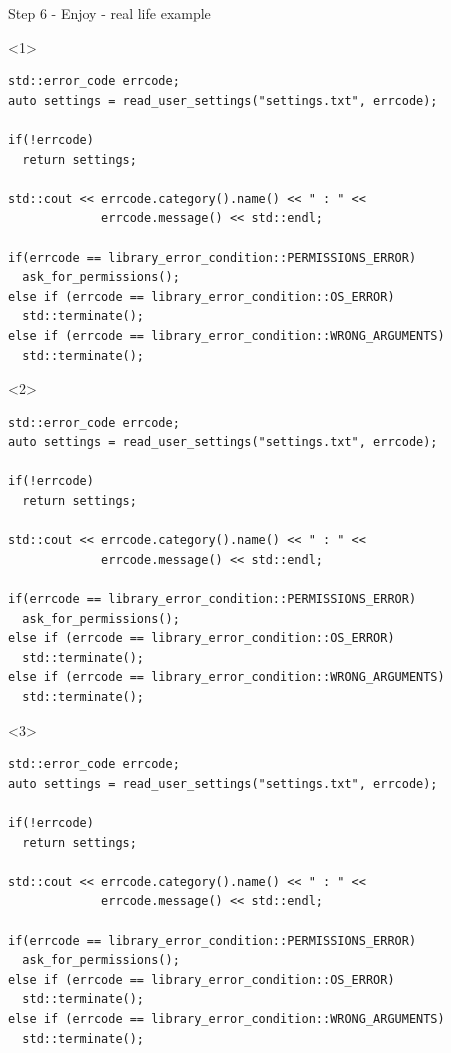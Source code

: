 \documentclass[10pt]{beamer}
\begin{document}
\begin{frame}[fragile]{Step 6 - Enjoy - real life example}
	\begin{onlyenv}
	\begin{verbatim}
std::error_code errcode;
auto settings = read_user_settings("settings.txt", errcode);

if(!errcode)
  return settings;

std::cout << errcode.category().name() << " : " <<
             errcode.message() << std::endl;

if(errcode == library_error_condition::PERMISSIONS_ERROR)
  ask_for_permissions();
else if (errcode == library_error_condition::OS_ERROR)
  std::terminate();
else if (errcode == library_error_condition::WRONG_ARGUMENTS)
  std::terminate();
	\end{verbatim}
	\end{onlyenv}

	\begin{onlyenv}
	\begin{verbatim}
std::error_code errcode;
auto settings = read_user_settings("settings.txt", errcode);

if(!errcode)
  return settings;

std::cout << errcode.category().name() << " : " <<
             errcode.message() << std::endl;

if(errcode == library_error_condition::PERMISSIONS_ERROR)
  ask_for_permissions();
else if (errcode == library_error_condition::OS_ERROR)
  std::terminate();
else if (errcode == library_error_condition::WRONG_ARGUMENTS)
  std::terminate();
	\end{verbatim}
	\end{onlyenv}

	\begin{onlyenv}
	\begin{verbatim}
std::error_code errcode;
auto settings = read_user_settings("settings.txt", errcode);

if(!errcode)
  return settings;

std::cout << errcode.category().name() << " : " <<
             errcode.message() << std::endl;

if(errcode == library_error_condition::PERMISSIONS_ERROR)
  ask_for_permissions();
else if (errcode == library_error_condition::OS_ERROR)
  std::terminate();
else if (errcode == library_error_condition::WRONG_ARGUMENTS)
  std::terminate();
	\end{verbatim}
	\end{onlyenv}


\end{frame}
\end{document}

